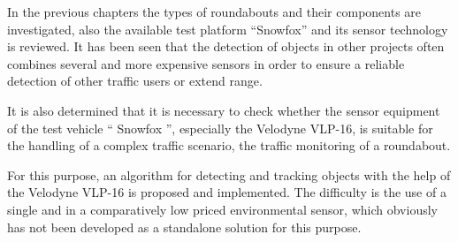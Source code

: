 \documentclass[11pt,oneside,openright]{mpreport}
\begin{document}


In the previous chapters the types of roundabouts and their components are investigated, also the available test platform ``Snowfox'' and its sensor technology is reviewed.
It has been seen that the detection of objects in other projects often combines several and more expensive sensors in order to ensure a reliable detection of other traffic users or
extend range.


It is also determined that it is necessary to check whether the sensor equipment of the test vehicle `` Snowfox '', especially the Velodyne VLP-16, is suitable for the 
handling of a complex traffic scenario, the traffic monitoring of a roundabout.


For this purpose, an algorithm for detecting and tracking objects with the help of the Velodyne VLP-16 is proposed and implemented. 
The difficulty is the use of a single and in a comparatively low priced environmental sensor, which obviously has not been developed as a standalone solution for this purpose.
\end{document}
